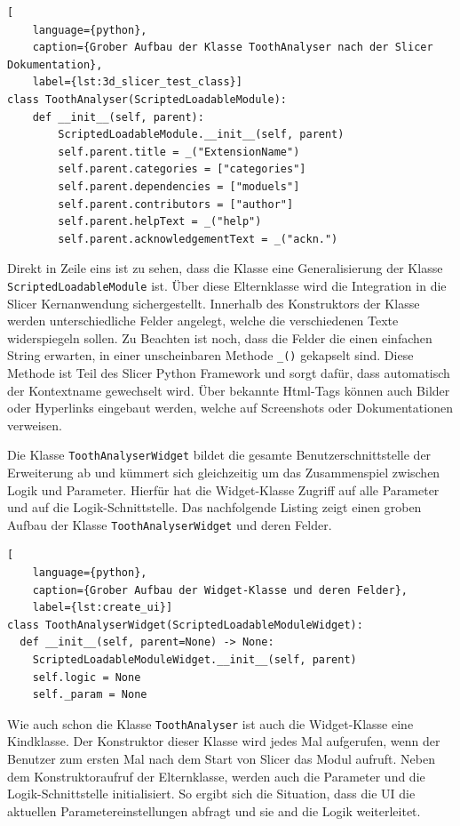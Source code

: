 \begin{lstlisting}[
    language={python},
    caption={Grober Aufbau der Klasse ToothAnalyser nach der Slicer Dokumentation},
    label={lst:3d_slicer_test_class}]
class ToothAnalyser(ScriptedLoadableModule):
    def __init__(self, parent):
	    ScriptedLoadableModule.__init__(self, parent)
	    self.parent.title = _("ExtensionName")
	    self.parent.categories = ["categories"]
	    self.parent.dependencies = ["moduels"]
	    self.parent.contributors = ["author"]
	    self.parent.helpText = _("help")
	    self.parent.acknowledgementText = _("ackn.")
\end{lstlisting}

Direkt in Zeile eins ist zu sehen, dass die Klasse eine Generalisierung der
Klasse \texttt{ScriptedLoadableModule} ist. Über diese Elternklasse wird die
Integration in die Slicer Kernanwendung sichergestellt. Innerhalb des Konstruktors
der Klasse werden unterschiedliche Felder angelegt, welche die verschiedenen
Texte widerspiegeln sollen. Zu Beachten ist noch, dass die Felder die einen
einfachen String erwarten, in einer unscheinbaren Methode \texttt{\_()}
gekapselt sind. Diese Methode ist Teil des Slicer Python Framework und sorgt dafür,
dass automatisch der Kontextname gewechselt wird. Über bekannte Html-Tags können
auch Bilder oder Hyperlinks eingebaut werden, welche auf Screenshots oder
Dokumentationen verweisen.

Die Klasse \texttt{ToothAnalyserWidget} bildet die gesamte Benutzerschnittstelle
der Erweiterung ab und kümmert sich gleichzeitig um das Zusammenspiel zwischen Logik
und Parameter. Hierfür hat die Widget-Klasse Zugriff auf alle Parameter und auf
die Logik-Schnittstelle. Das nachfolgende Listing zeigt einen groben Aufbau der Klasse
\texttt{ToothAnalyserWidget} und deren Felder.

\begin{lstlisting}[
    language={python},
    caption={Grober Aufbau der Widget-Klasse und deren Felder},
    label={lst:create_ui}]
class ToothAnalyserWidget(ScriptedLoadableModuleWidget):
  def __init__(self, parent=None) -> None:
    ScriptedLoadableModuleWidget.__init__(self, parent)
    self.logic = None
    self._param = None
\end{lstlisting}

Wie auch schon die Klasse \texttt{ToothAnalyser} ist auch die Widget-Klasse eine
Kindklasse. Der Konstruktor dieser Klasse wird jedes Mal aufgerufen, wenn der
Benutzer zum ersten Mal nach dem Start von Slicer das Modul aufruft. Neben dem Konstruktoraufruf
der Elternklasse, werden auch die Parameter und die Logik-Schnittstelle
initialisiert. So ergibt sich die Situation, dass die UI die aktuellen
Parametereinstellungen abfragt und sie and die Logik weiterleitet.

